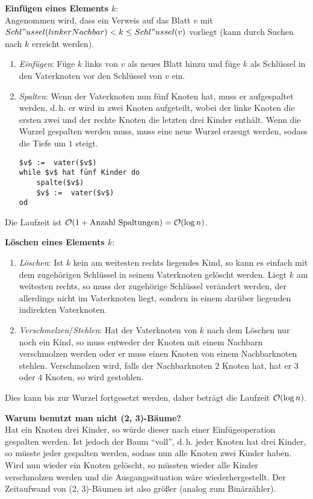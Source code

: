 \textbf{Einfügen eines Elements $k$}: \\
Angenommen wird, dass ein Verweis auf das Blatt $v$ mit
$Schl"ussel(linkerNachbar) < k \le Schl"ussel(v)$ vorliegt
(kann durch Suchen nach $k$ erreicht werden).
\begin{enumerate}
    \item
    \emph{Einfügen}:
    Füge $k$ links von $v$ als neues Blatt hinzu und füge $k$ als Schlüssel
    in den Vaterknoten vor den Schlüssel von $v$ ein.
    
    \item
    \emph{Spalten}:
    Wenn der Vaterknoten nun fünf Knoten hat, muss er aufgespaltet werden,
    d.\,h. er wird in zwei Knoten aufgeteilt, wobei der linke
    Knoten die ersten zwei und der rechte Knoten die letzten drei
    Kinder enthält.
    Wenn die Wurzel gespalten werden muss, muss eine neue Wurzel erzeugt
    werden, sodass die Tiefe um $1$ steigt.
    \begin{lstlisting}
$v$ :=  vater($v$)
while $v$ hat fünf Kinder do
    spalte($v$)
    $v$ :=  vater($v$)
od
    \end{lstlisting}
\end{enumerate}
Die Laufzeit ist $\mathcal{O}(1 + \text{Anzahl Spaltungen}) = \mathcal{O}(\log n)$.

\linie

\textbf{Löschen eines Elements $k$}:
\begin{enumerate}
    \item
    \emph{Löschen}:
    Ist $k$ kein am weitesten rechts liegendes Kind, so kann es einfach
    mit dem zugehörigen Schlüssel in seinem Vaterknoten gelöscht werden.
    Liegt $k$ am weitesten rechts, so muss der zugehörige Schlüssel
    verändert werden, der allerdings nicht im Vaterknoten liegt, sondern
    in einem darüber liegenden indirekten Vaterknoten.
    
    \item
    \emph{Verschmelzen}/\emph{Stehlen}:
    Hat der Vaterknoten von $k$ nach dem Löschen nur noch ein Kind, so
    muss entweder der Knoten mit einem Nachbarn verschmolzen werden oder
    er muss einen Knoten von einem Nachbarknoten stehlen.
    Verschmolzen wird, falls der Nachbarknoten $2$ Knoten hat, hat er
    $3$ oder $4$ Knoten, so wird gestohlen.
\end{enumerate}
Dies kann bis zur Wurzel fortgesetzt werden, daher beträgt die Laufzeit
$\mathcal{O}(\log n)$.

\linie

\textbf{Warum benutzt man nicht (2, 3)-Bäume?} \\
Hat ein Knoten drei Kinder, so würde dieser nach einer Einfügeoperation
gespalten werden.
Ist jedoch der Baum "`voll"', d.\,h. jeder Knoten hat drei Kinder,
so müsste jeder gespalten werden, sodass nun alle Knoten zwei Kinder haben.
Wird nun wieder ein Knoten gelöscht, so müssten wieder alle Kinder verschmolzen
werden und die Ausgangssituation wäre wiederhergestellt.
Der Zeitaufwand von (2, 3)-Bäumen ist also größer
(analog zum Binärzähler).


